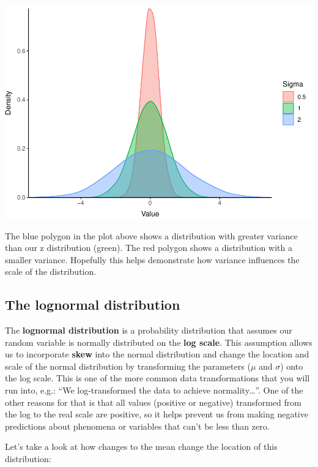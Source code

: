 \documentclass[
]{book}
\begin{document}
\includegraphics{worstr_files/figure-latex/unnamed-chunk-121-1.pdf}

The blue polygon in the plot above shows a distribution with greater variance than our z distribution (green). The red polygon shows a distribution with a smaller variance. Hopefully this helps demonstrate how variance influences the scale of the distribution.

\hypertarget{the-lognormal-distribution}{%
\subsection{The lognormal distribution}\label{the-lognormal-distribution}}

The \textbf{lognormal distribution} is a probability distribution that assumes our random variable is normally distributed on the \textbf{log scale}. This assumption allows us to incorporate \textbf{skew} into the normal distribution and change the location and scale of the normal distribution by transforming the parameters (\(\mu\) and \(\sigma\)) onto the log scale. This is one of the more common data transformations that you will run into, e.g.: ``We log-transformed the data to achieve normality\ldots{}''. One of the other reasons for that is that all values (positive or negative) transformed from the log to the real scale are positive, so it helps prevent us from making negative predictions about phenomena or variables that can't be less than zero.

Let's take a look at how changes to the mean change the location of this distribution:
\end{document}
